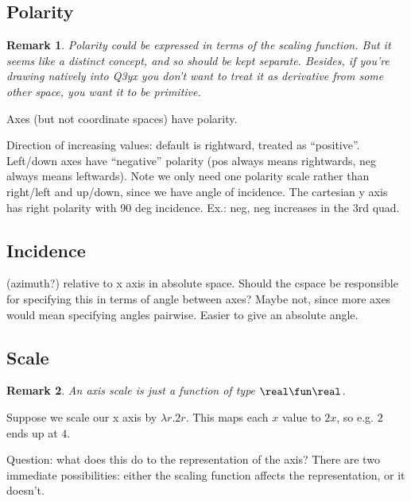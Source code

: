 \documentclass[reqno,12pt]{tufte-handout}
\numberwithin{equation}{subsection}
\numberwithin{equation}{subsection}
\newtheorem{remark}{Remark}
\newcommand\cspace{coordinate space}
\begin{document}
  \subsection{Polarity}
  \label{subs:polarity}

  \begin{remark}
    Polarity could be expressed in terms of the scaling function.  But
    it seems like a distinct concept, and so should be kept separate.
    Besides, if you're drawing natively into Q3yx you don't want to
    treat it as derivative from some other space, you want it to be
    primitive.
  \end{remark}

  Axes (but not \cspace{}s) have polarity.

  Direction of increasing values: default is rightward, treated as
  ``positive''.  Left/down axes have ``negative'' polarity (pos always
  means rightwards, neg always means leftwards).  Note we only need one
  polarity scale rather than right/left and up/down, since we have angle
  of incidence.  The cartesian y axis has right polarity with 90 deg
  incidence.  Ex.: neg, neg increases in the 3rd quad.

  \subsection{Incidence}
  \label{subs:incidence}

  (azimuth?) relative to x axis in absolute space.
  Should the cspace be responsible for specifying this in terms of
  angle between axes?  Maybe not, since more axes would mean
  specifying angles pairwise.  Easier to give an absolute angle.

  \subsection{Scale}
  \label{subs:axisscale}

\begin{remark}
  An axis scale is just a function of type \(\real\fun\real\).
\end{remark}

  Suppose we scale our x axis by \(\lambda r.2r\).  This maps each \(x\)
  value to \(2x\), so e.g. \(2\) ends up at \(4\).

  Question: what does this do to the representation of the axis?  There
  are two immediate possibilities: either the scaling function affects
  the representation, or it doesn't.
\end{document}
